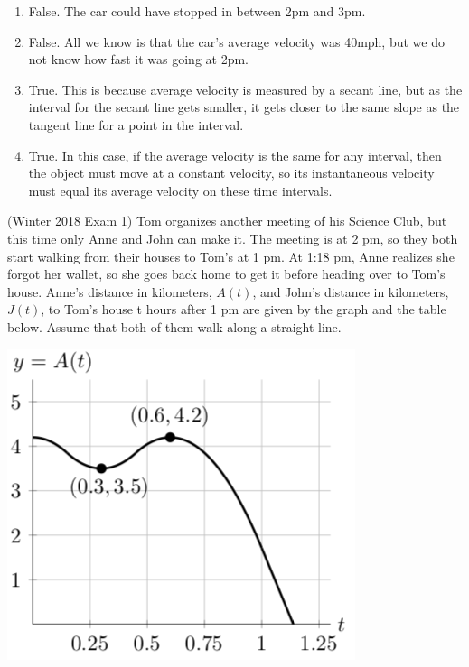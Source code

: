 \documentclass[11pt]{exam}
\begin{document}
\begin{questions}
  \begin{solution}
    \begin{enumerate}
    \item False. The car could have stopped in between 2pm and 3pm. 
    \item False. All we know is that the car's average velocity was
      40mph, but we do not know how fast it was going at 2pm.
    \item True. This is because average velocity is measured by a
      secant line, but as the interval for the secant line gets
      smaller, it gets closer to the same slope as the tangent line
      for a point in the interval.
    \item True. In this case, if the average velocity is the same for
      any interval, then the object must move at a constant velocity, so
      its instantaneous velocity must equal its average velocity on
      these time intervals.
    \end{enumerate}
  \end{solution}
\question (Winter 2018 Exam 1)
Tom organizes another meeting of his Science Club, but this time only Anne and John can make it. The meeting is at 2 pm, so they both start walking from their houses to Tom's at 1 pm. At 1:18 pm, Anne realizes she forgot her wallet, so she goes back home to get it before heading over to Tom's house.
Anne’s distance in kilometers, $A(t)$, and John's distance in kilometers, $J(t)$, to Tom's
house t hours after 1 pm are given by the graph and the table below. Assume that
both of them walk along a straight line.\\
\begin{minipage}{0.5\linewidth}
  \includegraphics[scale=0.4]{Figures/Tom.png}

\end{minipage}
\end{questions}
\end{document}
